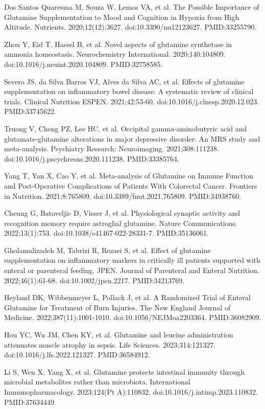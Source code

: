 \documentclass[12pt,oneside]{book}
\newcommand{\reff}[2]{\par\hangindent=7mm\hangafter=1\noindent[#1]\hspace{2mm}#2\par}
\begin{document}
\reff{20}{Dos Santos Quaresma M, Souza W, Lemos VA, et al. The Possible Importance of Glutamine Supplementation to Mood and Cognition in Hypoxia from High Altitude. Nutrients. 2020;12(12):3627. doi:10.3390/nu12123627. PMID:33255790.}

\reff{21}{Zhou Y, Eid T, Hassel B, et al. Novel aspects of glutamine synthetase in ammonia homeostasis. Neurochemistry International. 2020;140:104809. doi:10.1016/j.neuint.2020.104809. PMID:32758585.}

\reff{22}{Severo JS, da Silva Barros VJ, Alves da Silva AC, et al. Effects of glutamine supplementation on inflammatory bowel disease: A systematic review of clinical trials. Clinical Nutrition ESPEN. 2021;42:53-60. doi:10.1016/j.clnesp.2020.12.023. PMID:33745622.}

\reff{23}{Truong V, Cheng PZ, Lee HC, et al. Occipital gamma-aminobutyric acid and glutamate-glutamine alterations in major depressive disorder: An MRS study and meta-analysis. Psychiatry Research: Neuroimaging. 2021;308:111238. doi:10.1016/j.pscychresns.2020.111238. PMID:33385764.}

\reff{24}{Yang T, Yan X, Cao Y, et al. Meta-analysis of Glutamine on Immune Function and Post-Operative Complications of Patients With Colorectal Cancer. Frontiers in Nutrition. 2021;8:765809. doi:10.3389/fnut.2021.765809. PMID:34938760.}

\reff{25}{Cheung G, Bataveljic D, Visser J, et al. Physiological synaptic activity and recognition memory require astroglial glutamine. Nature Communications. 2022;13(1):753. doi:10.1038/s41467-022-28331-7. PMID:35136061.}

\reff{26}{Gholamalizadeh M, Tabrizi R, Rezaei S, et al. Effect of glutamine supplementation on inflammatory markers in critically ill patients supported with enteral or parenteral feeding. JPEN. Journal of Parenteral and Enteral Nutrition. 2022;46(1):61-68. doi:10.1002/jpen.2217. PMID:34213769.}

\reff{27}{Heyland DK, Wibbenmeyer L, Pollack J, et al. A Randomized Trial of Enteral Glutamine for Treatment of Burn Injuries. The New England Journal of Medicine. 2022;387(11):1001-1010. doi:10.1056/NEJMoa2203364. PMID:36082909.}

\reff{28}{Hou YC, Wu JM, Chen KY, et al. Glutamine and leucine administration attenuates muscle atrophy in sepsis. Life Sciences. 2023;314:121327. doi:10.1016/j.lfs.2022.121327. PMID:36584912.}

\reff{29}{Li S, Wen X, Yang X, et al. Glutamine protects intestinal immunity through microbial metabolites rather than microbiota. International Immunopharmacology. 2023;124(Pt A):110832. doi:10.1016/j.intimp.2023.110832. PMID:37634449.}
\end{document}
